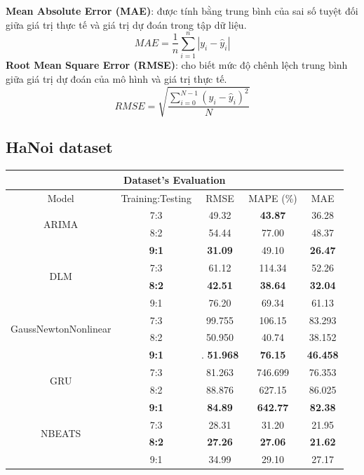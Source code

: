 \documentclass[conference]{IEEEtran}
\begin{document}
\textbf{Mean Absolute Error (MAE)}: được tính bằng trung bình của sai số tuyệt đối giữa giá trị thực tế và giá trị dự đoán trong tập dữ liệu.
\[
    MAE = \frac{1}{n}\sum_{i=1}^{n}\left|y_i-{\hat{y}}_i\right|
\]
\textbf{Root Mean Square Error (RMSE)}: cho biết mức độ chênh lệch trung bình giữa giá trị dự đoán của mô hình và giá trị thực tế.
\[
    RMSE = \sqrt{\frac{\sum_{i=0}^{N - 1} (y_i - \hat{y}_i)^2}{N}}
\]
\subsection{HaNoi dataset}
\begin{table}[H]
    \centering
    \begin{tabular}{|c|c|c|c|c|}
        \hline
        \multicolumn{5}{|c|}{\textbf{Dataset's Evaluation}}                                           \\
        \hline
        \centering Model                      & Training:Testing & RMSE    & MAPE (\%)      & MAE     \\
        \hline
        \multirow{2}{*}{ARIMA}                & 7:3              & 49.32   & \textbf{43.87} & 36.28   \\ & 8:2 & 54.44 & 77.00 & 48.37 \\ & \textbf{9:1} & \textbf{31.09} & 49.10 & \textbf{26.47} \\
        \hline
        \multirow{2}{*}{DLM}                  & 7:3              & 61.12   & 114.34         & 52.26   \\ & \textbf{8:2} & \textbf{42.51} & \textbf{38.64} & \textbf{32.04} \\ & 9:1 & 76.20 &  69.34 & 61.13\\
        \hline
        \multirow{2}{*}{GaussNewtonNonlinear} & 7:3              & 99.755  & 106.15         & 83.293  \\ &  8:2 & 50.950 & 40.74 & 38.152  \\ & \textbf{9:1} &. \textbf{51.968} & \textbf{76.15} & \textbf{46.458}\\
        \hline
        \multirow{2}{*}{GRU}                  & 7:3              & 81.263  & 746.699        & 76.353  \\ & 8:2 & 88.876 & 627.15 & 86.025 \\ & \textbf{9:1} & \textbf{84.89} & \textbf{642.77} & \textbf{82.38}\\
        \hline
        \multirow{2}{*}{NBEATS}               & 7:3              & 28.31   & 31.20          & 21.95   \\ & \textbf{8:2} & \textbf{27.26} & \textbf{27.06} & \textbf{21.62} \\ &  9:1 & 34.99 & 29.10 & 27.17\\

\end{tabular}
\end{table}
\end{document}
